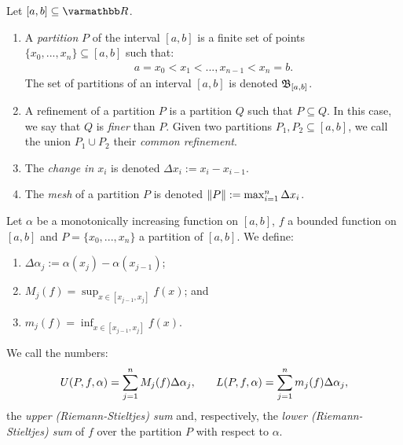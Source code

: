     \fi
    \begin{definition}
        Let $[a,b] \subseteq \bfR$.
        \begin{enumerate}[label = (\arabic*),itemsep=1pt,topsep=3pt]
            \item A \textit{partition} $P$ of the interval $[a,b]$ is a finite set of points $\{x_0,...,x_n\} \subseteq [a,b]$ such that:
                \begin{equation*}
                \begin{split}
                    a = x_0 < x_1 < ... , x_{n-1} < x_n = b.
                \end{split}
                \end{equation*}
            The set of partitions of an interval $[a,b]$ is denoted $\mathfrak{B}_{[a,b]}$.
            \item A refinement of a partition $P$ is a partition $Q$ such that $P \subseteq Q$. In this case, we say that $Q$ is \textit{finer} than $P$. Given two partitions $P_1,P_2 \subseteq [a,b]$, we call the union $P_1 \cup P_2$ their \textit{common refinement}.
            \item The \textit{change in $x_i$} is denoted $\Delta x_i := x_{i} - x_{i-1}$.
            \item The \textit{mesh} of a partition $P$ is denoted $\left\lVert P \right\rVert := \max_{i = 1}^n \Delta x_i$.
        \end{enumerate}
    \end{definition}

    \begin{definition}
        Let $\alpha$ be a monotonically increasing function on $[a,b]$, $f$ a bounded function on $[a,b]$ and $P=\{x_0,...,x_n\}$ a partition of $[a,b]$. We define:
            \begin{enumerate}[label = (\arabic*),itemsep=1pt,topsep=3pt]
                \item $\Delta \alpha_j := \alpha(x_j) - \alpha(x_{j-1})$;
                \item $M_j(f) = \sup_{x \in [x_{j-1},x_j]}f(x)$; and
                \item $m_j(f) = \inf_{x \in [x_{j-1},x_j]}f(x)$.
            \end{enumerate}
        We call the numbers:
            \begin{equation*}
            \begin{split}
                U(P,f,\alpha) = \sum_{j = 1}^n M_j(f)\Delta \alpha_j, \h9\h9 L(P,f,\alpha) = \sum_{j = 1}^n m_j(f)\Delta \alpha_j, 
            \end{split}
            \end{equation*}
        the \textit{upper (Riemann-Stieltjes) sum} and, respectively, the \textit{lower (Riemann-Stieltjes) sum} of $f$ over the partition $P$ with respect to $\alpha$.
    \end{definition}

